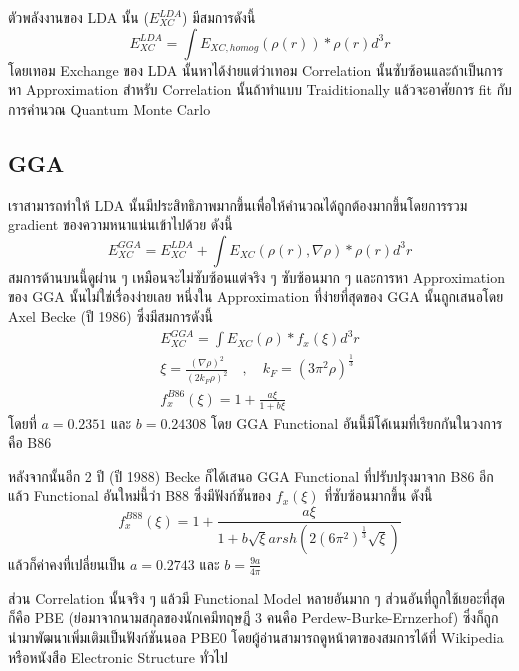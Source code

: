ตัวพลังงานของ LDA นั้น ($E^{LDA}_{XC}$) มีสมการดังนี้
%
\begin{equation}
    E^{LDA}_{XC} = \int E_{XC,homog} (\rho(r)) * \rho(r)d^{3}r
\end{equation}
%
โดยเทอม Exchange ของ LDA นั้นหาได้ง่ายแต่ว่าเทอม Correlation นั้นซับซ้อนและถ้าเป็นการหา Approximation สำหรับ Correlation นั้นถ้าทำแบบ Traiditionally แล้วจะอาศัยการ fit กับการคำนวณ Quantum Monte Carlo

\subsection{GGA}

เราสามารถทำให้ LDA นั้นมีประสิทธิภาพมากขึ้นเพื่อให้คำนวณได้ถูกต้องมากขึ้นโดยการรวม gradient ของความหนาแน่นเข้าไปด้วย ดังนี้
%
\begin{equation}
    E^{GGA}_{XC} = E^{LDA}_{XC} + \int E_{XC} (\rho(r), \nabla\rho) * \rho(r)d^{3}r
\end{equation}
%
สมการด้านบนนี้ดูผ่าน ๆ เหมือนจะไม่ซับซ้อนแต่จริง ๆ ซับซ้อนมาก ๆ และการหา Approximation ของ GGA นั้นไม่ใช่เรื่องง่ายเลย หนึ่งใน Approximation ที่ง่ายที่สุดของ GGA นั้นถูกเสนอโดย Axel Becke (ปี 1986) ซึ่งมีสมการดังนี้
%
\begin{gather}
    E^{GGA}_{XC} = \int E_{XC} (\rho) * f_{x}(\xi) d^{3}r \\
    \xi = \frac{(\nabla \rho)^{2}}{(2 k_{F} \rho)^{2}}
    \quad , \quad k_{F} = (3\pi^{2}\rho)^{\frac{1}{3}} \\
    f^{B86}_{x}(\xi) = 1 + \frac{a\xi}{1 + b\xi}
\end{gather}
%
\noindent โดยที่ $a = 0.2351$ และ $b = 0.24308$ โดย GGA Functional อันนี้มีโค้เนมที่เรียกกันในวงการคือ B86

หลังจากนั้นอีก 2 ปี (ปี 1988) Becke ก็ได้เสนอ GGA Functional ที่ปรับปรุงมาจาก B86 อีกแล้ว Functional อันใหม่นี้ว่า B88 ซึ่งมีฟังก์ชันของ $f_{x}(\xi)$ ที่ซับซ้อนมากขึ้น ดังนี้ 
%
\begin{equation}
    f^{B88}_{x}(\xi) = 
    1 + \frac{a\xi}{1 + b\sqrt{\xi} arsh (2(6\pi^{2})^{\frac{1}{3}} \sqrt{\xi })}
\end{equation}
%
\noindent แล้วก็ค่าคงที่เปลี่ยนเป็น $a = 0.2743$ และ $b = \frac{9a}{4\pi}$

ส่วน Correlation นั้นจริง ๆ แล้วมี Functional Model หลายอันมาก ๆ ส่วนอันที่ถูกใช้เยอะที่สุดก็คือ PBE (ย่อมาจากนามสกุลของนักเคมีทฤษฎี 3 คนคือ Perdew-Burke-Ernzerhof) ซึ่งก็ถูกนำมาพัฒนาเพิ่มเติมเป็นฟังก์ชันนอล PBE0 โดยผู้อ่านสามารถดูหน้าตาของสมการได้ที่ Wikipedia หรือหนังสือ Electronic Structure ทั่วไป 

